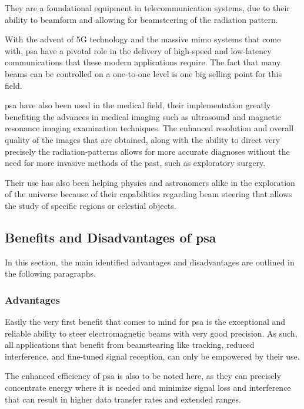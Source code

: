 \par They are a foundational equipment in telecommunication systems, due to their ability to beamform and allowing for beamsteering of the radiation pattern.

\par With the advent of 5G technology and the massive \ac{mimo} systems that come with, \ac{psa} have a pivotal role in the delivery of high-speed and low-latency communications that these modern applications require. The fact that many beams can be controlled on a one-to-one level is one big selling point for this field. 

\par \ac{psa} have also been used in the medical field, their implementation greatly benefiting the advances in medical imaging such as ultrasound and magnetic resonance imaging examination techniques. The enhanced resolution and overall quality of the images that are obtained, along with the ability to direct very precisely the radiation-patterns allows for more accurate diagnoses without the need for more invasive methods of the past, such as exploratory surgery.

\par Their use has also been helping physics and astronomers alike in the exploration of the universe because of their capabilities regarding beam steering that allows the study of specific regions or celestial objects.

\subsection{Benefits and Disadvantages of \ac{psa}}
\par In this section, the main identified advantages and disadvantages are outlined in the following paragraphs. 

\subsubsection{Advantages}
\par Easily the very first benefit that comes to mind for \ac{psa} is the exceptional and reliable ability to steer electromagnetic beams with very good precision. As such, all applications that benefit from beamstearing like tracking, reduced interference, and fine-tuned signal reception, can only be empowered by their use.

\par The enhanced efficiency of \ac{psa} is also to be noted here, as they can precisely concentrate energy where it is needed and minimize signal loss and interference that can result in higher data transfer rates and extended ranges.

